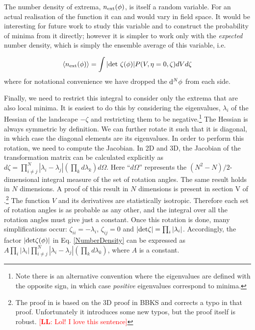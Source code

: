 \documentclass[12pt]{article}
\newcommand{\lfl}[1]{\textcolor{red}{[{\bf LL}: #1]}}
\begin{document}
The number density of extrema, $n_{\rm ext}(\phi)$, is itself a random variable. For an actual realisation of the function it can and would vary in field space. It would be interesting for future work to study this variable and to construct the probability of minima from it directly; however it is simpler to work only with the \emph{expected} number density, which is simply the ensemble average of this variable, i.e.

\begin{equation} \label{NumberDensity}
\langle n_{\rm ext}(\phi)  \rangle= \int |{\rm det}\,\, \zeta(\phi)| P(V,\eta=0,\zeta)dV d\zeta
\end{equation}
where for notational convenience we have dropped the ${\rm d}^N \phi$ from each side.

Finally, we need to restrict this integral to consider only the extrema that are also local minima. It is easiest to do this by considering the eigenvalues, $\lambda_i$ of the Hessian of the landscape $-\zeta$ and restricting them to be negative.\footnote{Note there is an alternative convention where the eigenvalues are defined with the opposite sign, in which case \emph{positive} eigenvalues correspond to minima.} The Hessian is always symmetric by definition. We can further rotate it such that it is diagonal, in which case the diagonal elements are its eigenvalues. In order to perform this rotation, we need to compute the Jacobian. In 2D and 3D, the Jacobian of the transformation matrix can be calculated explicitly as $d \zeta = \prod_{i \neq j}^N |\lambda_i - \lambda_j|(\prod_k d\lambda_k) d \Omega$. Here ``$d\Omega$'' represents the $(N^2-N)/2$-dimensional integral measure of the set of rotation angles. The same result holds in $N$ dimensions. A proof of this result in $N$ dimensions is present in section V of \cite{Easther2016}.\footnote{The proof in \cite{Easther2016} is based on the 3D proof in BBKS and corrects a typo in that proof. Unfortunately it introduces some new typos, but the proof itself is robust. \lfl{Lol! I love this sentence}} The function $V$ and its derivatives are statistically isotropic. Therefore each set of rotation angles is as probable as any other, and the integral over all the rotation angles must give just a constant. Once this rotation is done, many simplifications occur: $\zeta_{ii}=-\lambda_i$, $\zeta_{ij}=0$ and $|{\rm det} \zeta| = \prod_i |\lambda_i|$. Accordingly, the factor $|\rm{det} \zeta(\phi)|$ in Eq. \ref{NumberDensity} can be expressed as $A \prod_i |\lambda_i| \prod_{i \neq j}^N |\lambda_i - \lambda_j|(\prod_k d\lambda_k)$, where $A$ is a constant.
\end{document}
